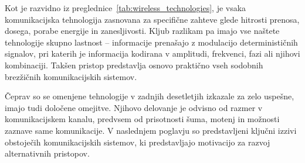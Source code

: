 \documentclass[a4paper, 12pt, openany]{book}
\begin{document}
\begin{table}[H]
\renewcommand{\arraystretch}{1.3}
\caption{Primerjava najpogosteje uporabljenih brezžičnih komunikacijskih tehnologij.}
\label{tab:wireless_technologies}
\end{table}

Kot je razvidno iz preglednice~\ref{tab:wireless_technologies}, je vsaka komunikacijska tehnologija zasnovana za specifične zahteve glede hitrosti prenosa, dosega, porabe energije in zanesljivosti. Kljub razlikam pa imajo vse naštete tehnologije skupno lastnost – informacije prenašajo z modulacijo determinističnih signalov, pri katerih je informacija kodirana v amplitudi, frekvenci, fazi ali njihovi kombinaciji. Takšen pristop predstavlja osnovo praktično vseh sodobnih brezžičnih komunikacijskih sistemov.

Čeprav so se omenjene tehnologije v zadnjih desetletjih izkazale za zelo uspešne, imajo tudi določene omejitve. Njihovo delovanje je odvisno od razmer v komunikacijskem kanalu, predvsem od prisotnosti šuma, motenj in možnosti zaznave same komunikacije. V naslednjem poglavju so predstavljeni ključni izzivi obstoječih komunikacijskih sistemov, ki predstavljajo motivacijo za razvoj alternativnih pristopov.
\end{document}
